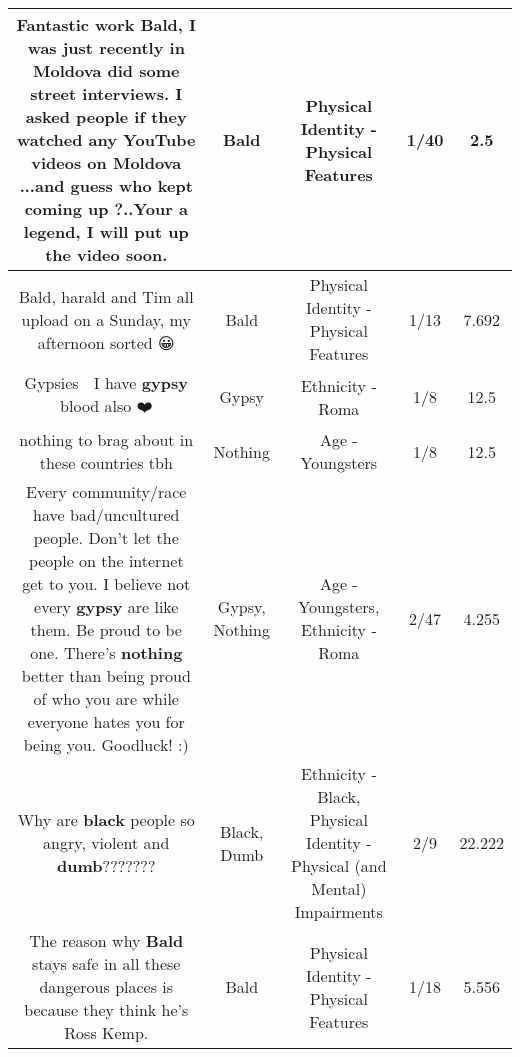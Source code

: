 \documentclass[11pt]{article}
\newlength\mylength
\begin{document}
\begin{center}
\begin{longtable}{|C{.65\mylength}|C{.30\mylength}|C{.12\mylength}|C{.12\mylength}|C{.12\mylength}|}
  \small Fantastic work \textbf{Bald}, I was just recently in Moldova did some street interviews. I asked people if they watched any YouTube videos on Moldova ...and guess who kept coming up ?..Your a legend, I will put up the video soon.\normalsize   & Bald & Physical Identity - Physical Features & 1/40 & 2.5 \\  \hline
  \small Bald, harald and Tim all upload on a Sunday, my afternoon sorted 😀\normalsize   & Bald & Physical Identity - Physical Features & 1/13 & 7.692 \\  \hline
  \small Gypsies 🥰 I have \textbf{gypsy} blood also ❤️\normalsize   & Gypsy & Ethnicity - Roma & 1/8 & 12.5 \\  \hline
  \small nothing to brag about in these countries tbh\normalsize   & Nothing & Age - Youngsters & 1/8 & 12.5 \\  \hline
  \small Every community/race have bad/uncultured people. Don't let the people on the internet get to you. I believe not every \textbf{gypsy} are like them. Be proud to be one. There's \textbf{nothing} better than being proud of who you are while everyone hates you for being you. Goodluck! :)\normalsize   & Gypsy, Nothing & Age - Youngsters, Ethnicity - Roma & 2/47 & 4.255 \\  \hline
  \small Why are \textbf{black} people so angry, violent and \textbf{dumb}???????\normalsize   & Black, Dumb & Ethnicity - Black, Physical Identity - Physical (and Mental) Impairments & 2/9 & 22.222 \\  \hline
  \small The reason why \textbf{Bald} stays safe in all these dangerous places is because they think he's Ross Kemp.\normalsize   & Bald & Physical Identity - Physical Features & 1/18 & 5.556 \\  \hline

\end{longtable}
\end{center}
\end{document}
